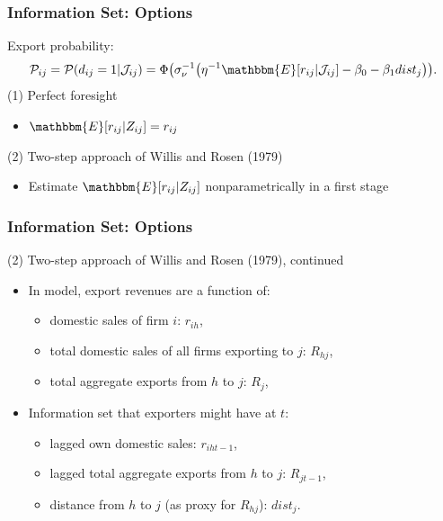 \documentclass[10pt,letterpaper]{beamer}
\begin{document}
\begin{frame}
\frametitle{Information Set: Options}
Export probability:
	\begin{align*}
	\mathcal{P}_{ij}=\mathcal{P}(d_{ij}=1|\mathcal{J}_{ij})=\Phi\big(\sigma_{\nu}^{-1}\big(\eta^{-1}\mathbbm{E}[r_{ij}|\mathcal{J}_{ij}]-\beta_{0}-\beta_{1}dist_{j}\big)\big).
	\end{align*}
(1) Perfect foresight
\begin{itemize}
\item $\mathbbm{E}[r_{ij}|Z_{ij}]=r_{ij}$
\end{itemize}
(2) Two-step approach of Willis and Rosen (1979)
\begin{itemize}
\item Estimate $\mathbbm{E}[r_{ij}|Z_{ij}]$ nonparametrically in a first stage 
\end{itemize}
\end{frame}

\begin{frame}
\frametitle{Information Set: Options}

(2) Two-step approach of Willis and Rosen (1979), continued
\begin{itemize}
	\item In model, export revenues are a function of:
	\begin{itemize}
		\item domestic sales of firm $i$: $r_{ih}$,
		\item total domestic sales of all firms exporting to $j$: $R_{hj}$,
		\item total aggregate exports from $h$ to $j$: $R_{j}$,
	\end{itemize}
	\item Information set that exporters might have at $t$:
	\begin{itemize}
		\item lagged own domestic sales: $r_{iht-1}$,
		\item lagged total aggregate exports from $h$ to $j$: $R_{jt-1}$,
		\item distance from $h$ to $j$ (as proxy for $R_{hj}$): $dist_{j}$.
	\end{itemize}
\end{itemize}
\end{frame}
\end{document}

